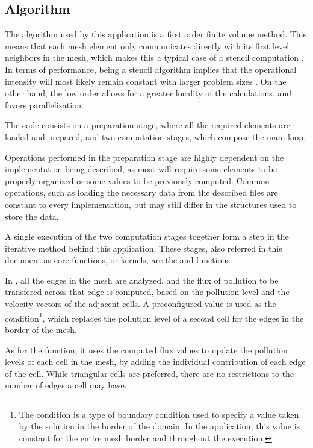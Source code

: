 \subsection{Algorithm}
\label{sec:210}


The algorithm used by this application is a first order finite volume method. This means that each mesh element only communicates directly with its first level neighbors in the mesh, which makes this a typical case of a stencil computation \cite{mitlab3}. In terms of performance, being a stencil algorithm implies that the operational intensity will most likely remain constant with larger problem sizes \cite{williams08,parlab2008}. On the other hand, the low order allows for a greater locality of the calculations, and favors parallelization.

The code consists on a preparation stage, where all the required elements are loaded and prepared, and two computation stages, which compose the main loop.

Operations performed in the preparation stage are highly dependent on the implementation being described, as most will require some elements to be properly organized or some values to be previously computed. Common operations, such as loading the necessary data from the described files are constant to every implementation, but may still differ in the structures used to store the data.

A single execution of the two computation stages together form a step in the iterative method behind this application. These stages, also referred in this document as core functions, or kernels, are the \computeflux and \update functions.

In \computeflux, all the edges in the mesh are analyzed, and the flux of pollution to be transfered across that edge is computed, based on the pollution level and the velocity vectors of the adjacent cells. A preconfigured value is used as the \dirichlet condition\footnote{The \dirichlet condition is a type of boundary condition used to specify a value taken by the solution in the border of the domain. In the \polu application, this value is constant for the entire mesh border and throughout the execution.}, which replaces the pollution level of a second cell for the edges in the border of the mesh.

As for the \update function, it uses the computed flux values to update the pollution levels of each cell in the mesh, by adding the individual contribution of each edge of the cell. While triangular cells are preferred, there are no restrictions to the number of edges a cell may have.
